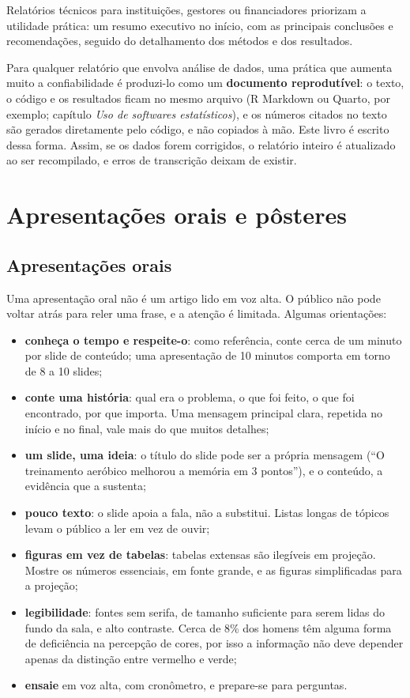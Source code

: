 \documentclass[
]{book}
\providecommand{\tightlist}{%
  \setlength{\itemsep}{0pt}\setlength{\parskip}{0pt}}
\begin{document}
Relatórios técnicos para instituições, gestores ou financiadores priorizam a utilidade prática: um resumo executivo no início, com as principais conclusões e recomendações, seguido do detalhamento dos métodos e dos resultados.

Para qualquer relatório que envolva análise de dados, uma prática que aumenta muito a confiabilidade é produzi-lo como um \textbf{documento reprodutível}: o texto, o código e os resultados ficam no mesmo arquivo (R Markdown ou Quarto, por exemplo; capítulo \emph{Uso de softwares estatísticos}), e os números citados no texto são gerados diretamente pelo código, e não copiados à mão. Este livro é escrito dessa forma. Assim, se os dados forem corrigidos, o relatório inteiro é atualizado ao ser recompilado, e erros de transcrição deixam de existir.

\section{Apresentações orais e pôsteres}\label{apresentauxe7uxf5es-orais-e-puxf4steres}

\subsection{Apresentações orais}\label{apresentauxe7uxf5es-orais}

Uma apresentação oral não é um artigo lido em voz alta. O público não pode voltar atrás para reler uma frase, e a atenção é limitada. Algumas orientações:

\begin{itemize}
\tightlist
\item
  \textbf{conheça o tempo e respeite-o}: como referência, conte cerca de um minuto por slide de conteúdo; uma apresentação de 10 minutos comporta em torno de 8 a 10 slides;
\item
  \textbf{conte uma história}: qual era o problema, o que foi feito, o que foi encontrado, por que importa. Uma mensagem principal clara, repetida no início e no final, vale mais do que muitos detalhes;
\item
  \textbf{um slide, uma ideia}: o título do slide pode ser a própria mensagem (``O treinamento aeróbico melhorou a memória em 3 pontos''), e o conteúdo, a evidência que a sustenta;
\item
  \textbf{pouco texto}: o slide apoia a fala, não a substitui. Listas longas de tópicos levam o público a ler em vez de ouvir;
\item
  \textbf{figuras em vez de tabelas}: tabelas extensas são ilegíveis em projeção. Mostre os números essenciais, em fonte grande, e as figuras simplificadas para a projeção;
\item
  \textbf{legibilidade}: fontes sem serifa, de tamanho suficiente para serem lidas do fundo da sala, e alto contraste. Cerca de 8\% dos homens têm alguma forma de deficiência na percepção de cores, por isso a informação não deve depender apenas da distinção entre vermelho e verde;
\item
  \textbf{ensaie} em voz alta, com cronômetro, e prepare-se para perguntas.
\end{itemize}
\end{document}
